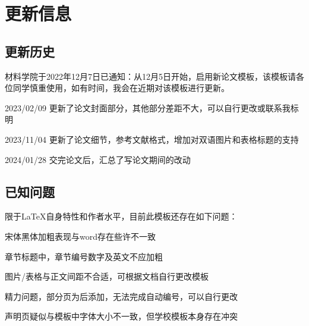 \chapter{更新信息}
\section{更新历史}
材料学院于2022年12月7日已通知：从12月5日开始，启用新论文模板，该模板请各位同学慎重使用，如有时间，我会在近期对该模板进行更新。

2023/02/09 更新了论文封面部分，其他部分差距不大，可以自行更改或联系我标明

2023/11/04 更新了论文细节，参考文献格式，增加对双语图片和表格标题的支持

2024/01/28 交完论文后，汇总了写论文期间的改动

\section{已知问题}
限于\LaTeX 自身特性和作者水平，目前此模板还存在如下问题：

宋体黑体加粗表现与word存在些许不一致

章节标题中，章节编号数字及英文不应加粗

图片/表格与正文间距不合适，可根据文档自行更改模板

精力问题，部分页为后添加，无法完成自动编号，可以自行更改

声明页疑似与模板中字体大小不一致，但学校模板本身存在冲突